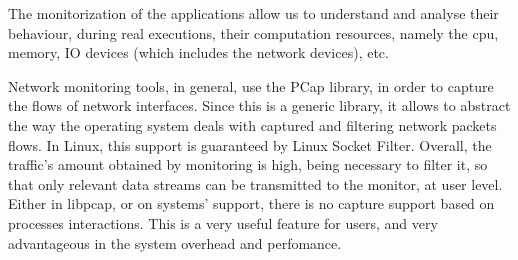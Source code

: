 \abstractEN




The monitorization of the applications allow us to understand and analyse their behaviour, during real executions, their computation resources, namely the cpu, memory, IO devices (which includes the network devices), etc.

Network monitoring tools, in general, use the PCap library, in order to capture the flows of network interfaces.
Since this is a generic library, it allows to abstract the way the operating system deals with captured and filtering network packets flows.
In Linux, this support is guaranteed by Linux Socket Filter.
Overall, the traffic’s amount obtained by monitoring is high, being necessary to filter it, so that only relevant data streams can be transmitted to the monitor, at user level.
Either in libpcap, or on systems’ support, there is no capture support based on processes interactions.
This is a very useful feature for users, and very advantageous in the system overhead and perfomance.
 
